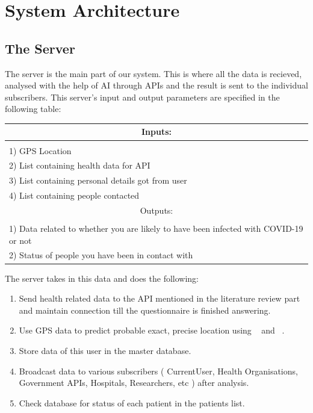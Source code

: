 \documentclass[10pt,twocolumn,letterpaper]{article}
\begin{document}

\section{System Architecture}

\subsection{The Server}
The server is the main part of our system. This is where all the data is recieved, analysed with the help of AI through APIs and the result is sent to the individual subscribers.\newline\newline
This server's input and output parameters are specified in the following table:\newline\newline
\begin{tabular}{ |p{8cm}|  }
 \hline
 \multicolumn{2}{|c|}{Inputs:} \\
 \hline\\
 1) GPS Location\\
 2) List containing health data for API\\
 3) List containing personal details got from user\\
 4) List containing people contacted\\
 \hline
 \multicolumn{2}{|c|}{Outputs:} \\
 \hline\\
 1) Data related to whether you are likely to have been infected with COVID-19 or not \\
 2) Status of people you have been in contact with\\
 \hline
\end{tabular}
\newline\newline
The server takes in this data and does the following:
\begin{enumerate}
  \item Send health related data to the API mentioned in the literature review part and maintain connection till the questionnaire is finished answering.
  \item Use GPS data to predict probable exact, precise location using ~\cite{1} and ~\cite{2}.
  \item Store data of this user in the master database.
  \item Broadcast data to various subscribers ( CurrentUser, Health Organisations, Government APIs, Hospitals, Researchers, etc ) after analysis.
  \item Check database for status of each patient in the patients list.
\end{enumerate}\\
\end{document}

